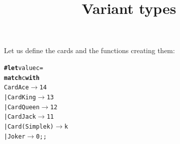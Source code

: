 \documentclass[wide]{slides}
\begin{document}
\begin{slide}
  \title{Variant types}

  Let us define the cards and the functions creating them:
  \medskip

  \noindent{}

  \noindent{}

  \medskip

  \noindent{}

  \noindent{}

  \medskip

  \noindent{}

  \noindent{}

\begin{alltt}
\textbf{\# let} value c =
    \textbf{match} c \textbf{with}
      Card Ace         \(\rightarrow\) 14
    | Card King        \(\rightarrow\) 13
    | Card Queen       \(\rightarrow\) 12
    | Card Jack        \(\rightarrow\) 11
    | Card (Simple k) \(\rightarrow\) k
    | Joker             \(\rightarrow\) 0;;
\end{alltt}

\end{slide}
\end{document}
